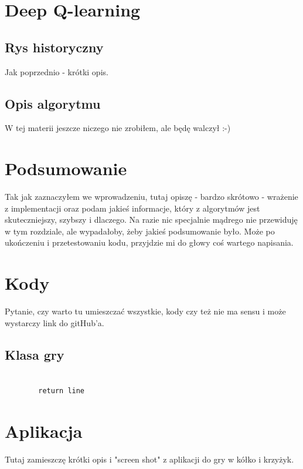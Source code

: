 \documentclass[licencjacka]{pracamgr}
\begin{document}
\chapter{Deep Q-learning}\label{r:Siec}

\section{Rys historyczny}
Jak poprzednio - krótki opis.

\section{Opis algorytmu}
W tej materii jeszcze niczego nie zrobiłem, ale będę walczył :-)

\chapter{Podsumowanie}

Tak jak zaznaczyłem we wprowadzeniu, tutaj opiszę - bardzo skrótowo - wrażenie z implementacji oraz podam jakieś informacje, który z algorytmów jest skuteczniejszy, szybszy i dlaczego. Na razie nic specjalnie mądrego nie przewiduję w tym rozdziale, ale wypadałoby, żeby jakieś podsumowanie było. Może po ukończeniu i przetestowaniu kodu, przyjdzie mi do głowy coś wartego napisania.

\appendix

\chapter{Kody}
Pytanie, czy warto tu umieszczać wszystkie, kody czy też nie ma sensu i może wystarczy link do gitHub'a.

\section{Klasa gry}

\begin{lstlisting}
        
        return line

\end{lstlisting}

\chapter{Aplikacja}

Tutaj zamieszczę krótki opis i "screen shot" z aplikacji do gry w kółko i krzyżyk.
\end{document}
